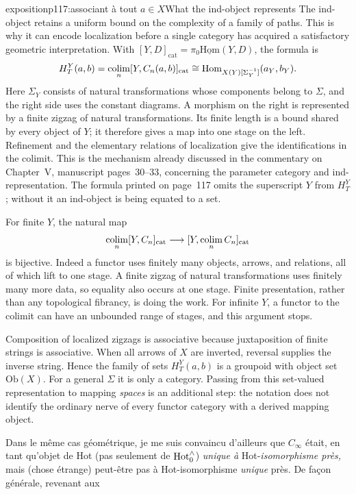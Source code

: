 \begin{dcomment}{exposition}{p117:associant à tout $a \in X$}{What the ind-object represents}
The ind-object retains a uniform bound on the complexity of a family of paths. This is why it can encode localization before a single category has acquired a satisfactory geometric interpretation. With $[Y,D]_{\mathrm{cat}}=\pi_0\underline{\mathrm{Hom}}(Y,D)$, the formula is
\[
 H_T^Y(a,b)=\mathop{\rm colim}_n[Y,C_n(a,b)]_{\mathrm{cat}}
 \cong\mathrm{Hom}_{X(Y)[\Sigma_Y^{-1}]}(a_Y,b_Y).
\]
Here $\Sigma_Y$ consists of natural transformations whose components belong to $\Sigma$, and the right side uses the constant diagrams. A morphism on the right is represented by a finite zigzag of natural transformations. Its finite length is a bound shared by every object of $Y$; it therefore gives a map into one stage on the left. Refinement and the elementary relations of localization give the identifications in the colimit. This is the mechanism already discussed in the commentary on Chapter~V, manuscript pages~30--33, concerning the parameter category and ind-representation. The formula printed on page~117 omits the superscript $Y$ from $H_T^Y$; without it an ind-object is being equated to a set.

For finite $Y$, the natural map
\[
 \mathop{\rm colim}_n[Y,C_n]_{\mathrm{cat}}
       \longrightarrow [Y,\mathop{\rm colim}_n C_n]_{\mathrm{cat}}
\]
is bijective. Indeed a functor uses finitely many objects, arrows, and relations, all of which lift to one stage. A finite zigzag of natural transformations uses finitely many more data, so equality also occurs at one stage. Finite presentation, rather than any topological fibrancy, is doing the work. For infinite $Y$, a functor to the colimit can have an unbounded range of stages, and this argument stops.

Composition of localized zigzags is associative because juxtaposition of finite strings is associative. When all arrows of $X$ are inverted, reversal supplies the inverse string. Hence the family of sets $H_T^Y(a,b)$ is a groupoid with object set $\mathrm{Ob}(X)$. For a general $\Sigma$ it is only a category. Passing from this set-valued representation to mapping \emph{spaces} is an additional step: the notation does not identify the ordinary nerve of every functor category with a derived mapping object.
\end{dcomment}


Dans le même cas géométrique, je me suis convaincu d'ailleurs que $C_{\infty}$ était, en tant qu'objet de Hot (pas seulement de $\mathrm{Hot}^{\wedge}_{0}$) \textit{unique à} Hot-\textit{isomorphisme près,} mais (chose étrange) peut-être pas à Hot-isomorphisme \textit{unique} près. De façon générale, revenant aux


